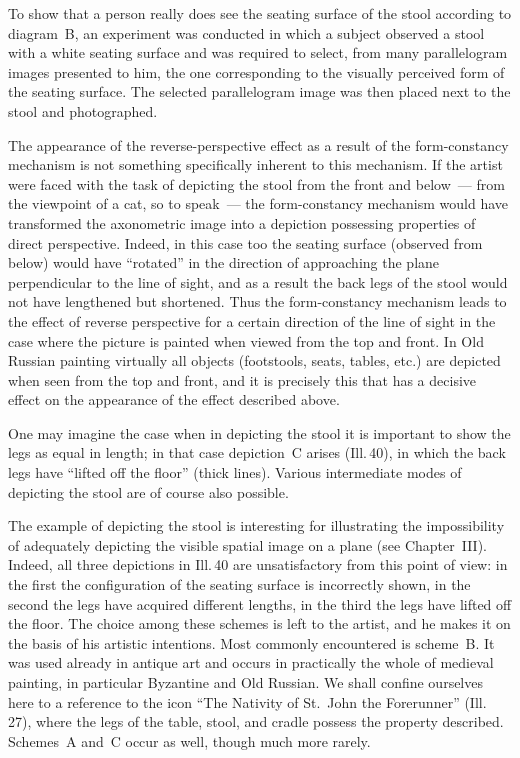 

To show that a person really does see the seating surface of the stool according to
diagram~B, an experiment was conducted in which a subject observed a stool with a
white seating surface and was required to select, from many parallelogram images
presented to him, the one corresponding to the visually perceived form of the seating
surface.  The selected parallelogram image was then placed next to the stool and
photographed.


The appearance of the reverse-perspective effect as a result of the form-constancy
mechanism is not something specifically inherent to this mechanism.  If the artist
were faced with the task of depicting the stool from the front and below~--- from the
viewpoint of a cat, so to speak~--- the form-constancy mechanism would have
transformed the axonometric image into a depiction possessing properties of direct
perspective.  Indeed, in this case too the seating surface (observed from below)
would have ``rotated'' in the direction of approaching the plane perpendicular to the
line of sight, and as a result the back legs of the stool would not have lengthened
but shortened.  Thus the form-constancy mechanism leads to the effect of reverse
perspective for a certain direction of the line of sight in the case where the
picture is painted when viewed from the top and front.  In Old Russian painting
virtually all objects (footstools, seats, tables, etc.) are depicted when seen from
the top and front, and it is precisely this that has a decisive effect on the
appearance of the effect described above.

One may imagine the case when in depicting the stool it is important to show the legs
as equal in length; in that case depiction~C arises (Ill.\,40), in which the back
legs have ``lifted off the floor'' (thick lines).  Various intermediate modes of
depicting the stool are of course also possible.

The example of depicting the stool is interesting for illustrating the impossibility
of adequately depicting the visible spatial image on a plane (see Chapter~III).
Indeed, all three depictions in Ill.\,40 are unsatisfactory from this point of view:
in the first the configuration of the seating surface is incorrectly shown, in the
second the legs have acquired different lengths, in the third the legs have lifted off
the floor.  The choice among these schemes is left to the artist, and he makes it on
the basis of his artistic intentions.  Most commonly encountered is scheme~B.  It was
used already in antique art and occurs in practically the whole of medieval painting,
in particular Byzantine and Old Russian.  We shall confine ourselves here to a
reference to the icon ``The Nativity of St.~John the Forerunner'' (Ill.\,27), where
the legs of the table, stool, and cradle possess the property described.  Schemes~A
and~C occur as well, though much more rarely.


